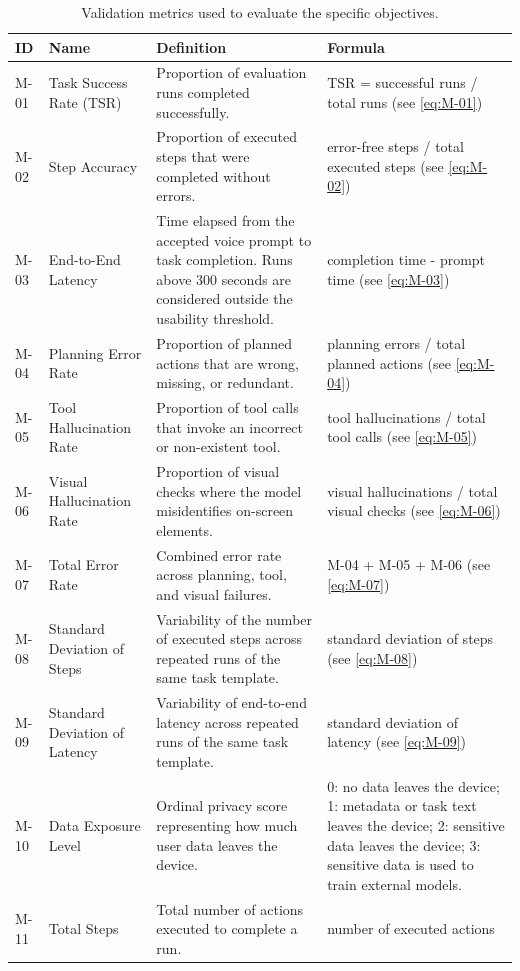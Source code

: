 \begin{table}[H]
\centering
\footnotesize
\setlength{\tabcolsep}{3pt}
\renewcommand{\arraystretch}{1.3}
\begin{tabular}{|p{0.7cm}|p{2.6cm}|p{5.5cm}|p{3.9cm}|}
\hline
\textbf{ID} & \textbf{Name} & \textbf{Definition} & \textbf{Formula} \\
\hline
M-01 & Task Success Rate (TSR) & Proportion of evaluation runs completed successfully. & TSR = successful runs / total runs (see \eqref{eq:M-01}) \\
\hline
M-02 & Step Accuracy & Proportion of executed steps that were completed without errors. & error-free steps / total executed steps (see \eqref{eq:M-02}) \\
\hline
M-03 & End-to-End Latency & Time elapsed from the accepted voice prompt to task completion. Runs above 300 seconds are considered outside the usability threshold. & completion time - prompt time (see \eqref{eq:M-03}) \\
\hline
M-04 & Planning Error Rate & Proportion of planned actions that are wrong, missing, or redundant. & planning errors / total planned actions (see \eqref{eq:M-04}) \\
\hline
M-05 & Tool Hallucination Rate & Proportion of tool calls that invoke an incorrect or non-existent tool. & tool hallucinations / total tool calls (see \eqref{eq:M-05}) \\
\hline
M-06 & Visual Hallucination Rate & Proportion of visual checks where the model misidentifies on-screen elements. & visual hallucinations / total visual checks (see \eqref{eq:M-06}) \\
\hline
M-07 & Total Error Rate & Combined error rate across planning, tool, and visual failures. & M-04 + M-05 + M-06 (see \eqref{eq:M-07}) \\
\hline
M-08 & Standard Deviation of Steps & Variability of the number of executed steps across repeated runs of the same task template. & standard deviation of steps (see \eqref{eq:M-08}) \\
\hline
M-09 & Standard Deviation of Latency & Variability of end-to-end latency across repeated runs of the same task template. & standard deviation of latency (see \eqref{eq:M-09}) \\
\hline
M-10 & Data Exposure Level & Ordinal privacy score representing how much user data leaves the device. & 0: no data leaves the device; 1: metadata or task text leaves the device; 2: sensitive data leaves the device; 3: sensitive data is used to train external models. \\
\hline
M-11 & Total Steps & Total number of actions executed to complete a run. & number of executed actions \\
\hline
\end{tabular}
\caption{Validation metrics used to evaluate the specific objectives.}
\label{tab:validation_metrics}
\end{table}
